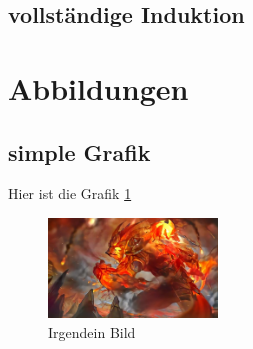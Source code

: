 \documentclass{scrartcl}
\begin{document}
\subsection{vollständige Induktion}

\section{Abbildungen}
\subsection{simple Grafik}
Hier ist die Grafik \ref{fig:Herbstfang}
\noindent
\FloatBarrier
\begin{figure}[ht]
    \centering
    \includegraphics[width=0.4\textwidth]{Graphics/Herbstfang.jpg}
    \caption{Irgendein Bild}
    \label{fig:Herbstfang}
\end{figure}
\FloatBarrier
\noindent
\end{document}
